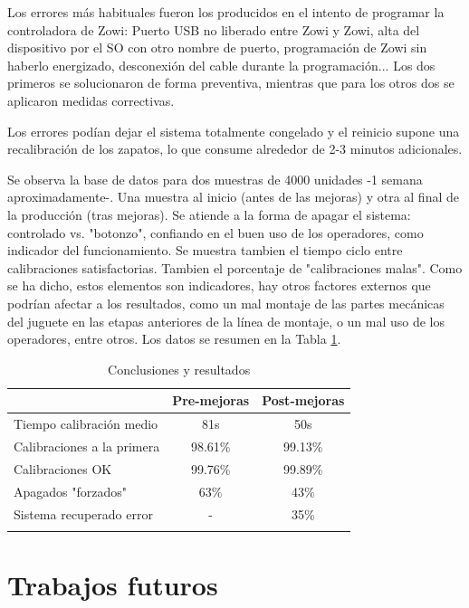 Los errores más habituales fueron los producidos en el intento de programar la controladora de Zowi: Puerto USB no liberado entre Zowi y Zowi, alta del dispositivo por el SO con otro nombre de puerto, programación de Zowi sin haberlo energizado, desconexión del cable durante la programación... Los dos primeros se solucionaron de forma preventiva, mientras que para los otros dos se aplicaron medidas correctivas.

Los errores podían dejar el sistema totalmente congelado y el reinicio supone una recalibración de los zapatos, lo que consume alrededor de 2-3 minutos adicionales.

Se observa la base de datos para dos muestras de 4000 unidades -1 semana aproximadamente-. Una muestra al inicio (antes de las mejoras) y otra al final de la producción (tras mejoras). Se atiende a la forma de apagar el sistema: controlado vs. "botonzo", confiando en el buen uso de los operadores, como indicador del funcionamiento. Se muestra tambien el tiempo ciclo entre calibraciones satisfactorias. Tambien el porcentaje de "calibraciones malas". Como se ha dicho, estos elementos son indicadores, hay otros factores externos que podrían afectar a los resultados, como un mal montaje de las partes mecánicas del juguete en las etapas anteriores de la línea de montaje, o un mal uso de los operadores, entre otros. Los datos se resumen en la Tabla \ref{tableResults}.

\begin{table}[h]
\centering
\begin{tabular}{l c c}
\toprule
 & \textbf{Pre-mejoras} & \textbf{Post-mejoras} \\
\midrule
Tiempo calibración medio & 81s & 50s \\
Calibraciones a la primera & 98.61\% & 99.13\% \\
Calibraciones OK & 99.76\% & 99.89\% \\
Apagados "forzados" & 63\% & 43\% \\
Sistema recuperado error & - & 35\% \\
\bottomrule\\
\end{tabular}
\caption{Conclusiones y resultados}
\label{tableResults}
\end{table}

\section{Trabajos futuros}

